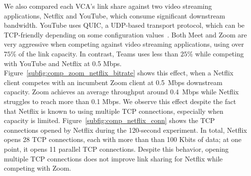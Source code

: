We also compared each VCA's link share against two video streaming
applications, Netflix and YouTube,
which consume significant downstream bandwidth. 
YouTube uses QUIC, a UDP-based transport protocol,
which can be TCP-friendly depending on some configuration values~\cite{corbel2019assessing}. 
Both Meet and Zoom are
very aggressive when competing against video streaming applications, using
over $75\%$ of the link capacity. In contrast, Teams uses
less than $25\%$ while competing with YouTube and Netflix at 0.5 Mbps.  
Figure~\ref{subfig:comp_zoom_netflix_bitrate} shows this effect, when a
Netflix client competes with an incumbent Zoom client at 0.5~Mbps downstream
capacity. Zoom achieves an average throughput around 0.4~Mbps while
Netflix struggles to reach more than 0.1 Mbps. We observe this effect despite
the fact that Netflix is
known to using multiple TCP connections, especially when capacity is limited.
Figure~\ref{subfig:comp_netflix_conn} shows the TCP connections
opened by Netflix during the 120-second experiment. In total, Netflix opens 28
TCP connections, each with more than than 100 Kbits of data; at one point, it
opens 11 parallel TCP
connections. Despite this behavior, opening multiple TCP connections
does not improve link sharing for Netflix while competing with Zoom. 




